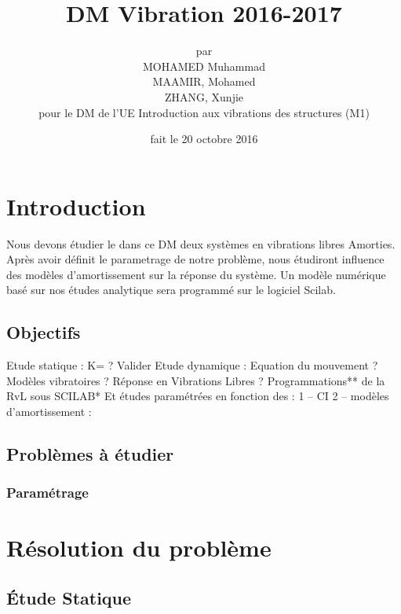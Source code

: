 \documentclass[a4paper,10pt]{report} %
\title{DM Vibration 2016-2017} %
\author{par\\MOHAMED Muhammad\\ MAAMIR, Mohamed\\ ZHANG, Xunjie \\pour le DM de l'UE Introduction aux vibrations des structures (M1)} %
\date{fait le 20 octobre 2016} %
\begin{document}
\maketitle %
\tableofcontents %
\listoffigures %













\chapter{Introduction} %

Nous devons étudier le dans ce DM deux systèmes en vibrations libres Amorties. Après avoir définit le parametrage de notre problème, nous étudiront influence des modèles d'amortissement sur la réponse du système.
Un modèle numérique basé sur nos études analytique sera programmé sur le logiciel Scilab.


\section{Objectifs}

Etude statique : K= ? Valider
Etude dynamique : Equation du mouvement ?
Modèles vibratoires ? 
Réponse en Vibrations Libres ?
Programmations** de la  RvL  sous SCILAB*
Et études paramétrées en fonction des :
1 – CI
2 – modèles d'amortissement : 

\section{Problèmes à étudier}

\subsection{Paramétrage}
 
\chapter{Résolution du problème}
\section{Étude Statique}
\end{document}
